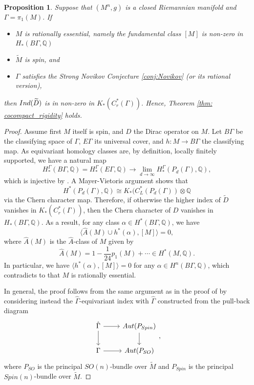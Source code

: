 \documentclass[12pt, reqno]{amsart}
\theoremstyle{plain}%
\newtheorem{proposition}[theorem]{Proposition}
\theoremstyle{definition}
\theoremstyle{remark}
\numberwithin{equation}{section}
\newcommand{\ind}{\textup{Ind}}
\begin{document}
\begin{proposition}
	Suppose that $(M^n, g)$ is a closed Riemannian manifold and $\Gamma=\pi_1(M)$. If
	\begin{itemize}
		\item $M$ is rationally essential, namely the fundamental class $[M]$ is non-zero in $H_*(B\Gamma,\mathbb Q)$
        \item $\widetilde M$ is spin, and
		\item $\Gamma$ satisfies the Strong Novikov Conjecture \ref{conj:Novikov} (or its rational version),
	\end{itemize}
	then $\ind(\widetilde D)$ is in non-zero in $K_*(C^*_r(\Gamma))$. Hence, Theorem \ref{thm: cocompact_rigidity} holds.
\end{proposition}
\begin{proof}
    Assume first $M$ itself is spin, and $D$ the Dirac operator on $M$. Let $B\Gamma$ be the classifying space of $\Gamma$, $E\Gamma$ its universal cover, and $h\colon M\to B\Gamma$ the classifying map. As equivariant homology classes are, by definition, locally finitely supported, we have a natural map
    $$H^\Gamma_*(B\Gamma,\mathbb Q)=H_*^\Gamma(E\Gamma,\mathbb Q)\to \lim_{d\to\infty} H_*^\Gamma(P_d(\Gamma),\mathbb Q),$$
    which is injective by \cite[(7.4)]{BaumConnesHigson}. A Mayer-Vietoris argument shows that
    $$H^*(P_d(\Gamma),\mathbb Q)\cong K_*(C^*_L(P_d(\Gamma))\otimes\mathbb Q$$
    via the Chern character map. Therefore, if otherwise the higher index of $\widetilde D$ vanishes in $K_*(C^*_r(\Gamma))$, then the Chern character of $D$ vanishes in $H_*(B\Gamma,\mathbb Q)$. As a result, for any class $\alpha\in H^*(B\Gamma,\mathbb Q)$, we have 
    $$\langle\hat A(M)\cup h^*(\alpha),[M]\rangle=0,$$
    where $\hat A(M)$ is the $\hat A$-class of $M$ given by
    $$\hat A(M)=1-\frac{1}{24} p_1(M)+\cdots\in H^*(M,\mathbb Q).$$
    In particular, we have $\langle h^*(\alpha),[M]\rangle=0$ for any $\alpha\in H^n(B\Gamma,\mathbb Q)$, which contradicts to that $M$ is rationally essential.

    In general, the proof follows from the same argument as in the proof of \cite[Theorem 3.5]{MR720934} by considering instead the $\hat \Gamma$-equivariant index with $\hat \Gamma$ constructed from the pull-back diagram
    $$\begin{tikzcd}
\hat\Gamma \arrow[r] \arrow[d] & Aut(P_{Spin}) \arrow[d] \\
\Gamma \arrow[r]               & Aut(P_{SO})            
\end{tikzcd},$$
where $P_{SO}$ is the principal $SO(n)$-bundle over $\widetilde M$ and $P_{Spin}$ is the principal $Spin(n)$-bundle over $\widetilde M$.
\end{proof}
\end{document}
